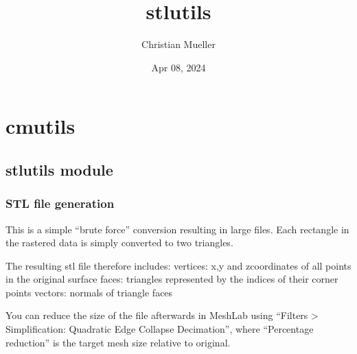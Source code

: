 \documentclass[letterpaper,10pt,english]{sphinxmanual}
\title{stlutils}
\date{Apr 08, 2024}
\author{Christian Mueller}
\begin{document}
\pagestyle{empty}
\sphinxmaketitle
\pagestyle{plain}
\sphinxtableofcontents
\pagestyle{normal}
\label{\detokenize{index::doc}}



\chapter{cmutils}
\label{\detokenize{modules:cmutils}}\label{\detokenize{modules::doc}}

\section{stlutils module}
\label{\detokenize{stlutils:module-stlutils}}\label{\detokenize{stlutils:stlutils-module}}\label{\detokenize{stlutils::doc}}

\subsection{STL file generation}
\label{\detokenize{stlutils:stl-file-generation}}
\sphinxAtStartPar
This is a simple “brute force” conversion resulting in large files.
Each rectangle in the rastered data is simply converted to two triangles.

\sphinxAtStartPar
The resulting stl file therefore includes:  
\sphinxhyphen{} vertices: x\sphinxhyphen{},y\sphinxhyphen{} and z\sphinxhyphen{}coordinates of all points in the original surface  
\sphinxhyphen{} faces: triangles represented by the indices of their corner points  
\sphinxhyphen{} vectors: normals of triangle faces

\sphinxAtStartPar
You can reduce the size of the file afterwards in MeshLab using
“Filters \sphinxhyphen{}\textgreater{} Simplification: Quadratic Edge Collapse Decimation”,
where “Percentage reduction” is the target mesh size relative to original.
\end{document}
